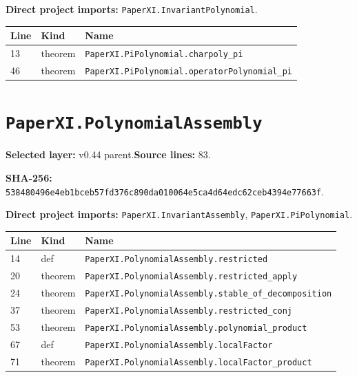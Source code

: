 \documentclass[10pt,oneside]{book}
\begin{document}
\textbf{Direct project imports:} \nolinkurl{PaperXI.InvariantPolynomial}.

\begin{longtable}{@{}p{}p{}p{}@{}}\toprule Line&Kind&Name\\\midrule\endhead

13&theorem&\nolinkurl{PaperXI.PiPolynomial.charpoly_pi}\\

46&theorem&\nolinkurl{PaperXI.PiPolynomial.operatorPolynomial_pi}\\

\bottomrule\end{longtable}

\section{\texorpdfstring{\nolinkurl{PaperXI.PolynomialAssembly}}{PaperXI.PolynomialAssembly}}\label{module:PaperXI.PolynomialAssembly}

\textbf{Selected layer:} v0.44 parent.\quad\textbf{Source lines:} 83.\par\textbf{SHA-256:} {\scriptsize\nolinkurl{538480496e4eb1bceb57fd376c890da010064e5ca4d64edc62ceb4394e77663f}}.


\textbf{Direct project imports:} \nolinkurl{PaperXI.InvariantAssembly}, \nolinkurl{PaperXI.PiPolynomial}.

\begin{longtable}{@{}p{}p{}p{}@{}}\toprule Line&Kind&Name\\\midrule\endhead

14&def&\nolinkurl{PaperXI.PolynomialAssembly.restricted}\\

20&theorem&\nolinkurl{PaperXI.PolynomialAssembly.restricted_apply}\\

24&theorem&\nolinkurl{PaperXI.PolynomialAssembly.stable_of_decomposition}\\

37&theorem&\nolinkurl{PaperXI.PolynomialAssembly.restricted_conj}\\

53&theorem&\nolinkurl{PaperXI.PolynomialAssembly.polynomial_product}\\

67&def&\nolinkurl{PaperXI.PolynomialAssembly.localFactor}\\

71&theorem&\nolinkurl{PaperXI.PolynomialAssembly.localFactor_product}\\

\bottomrule\end{longtable}
\end{document}
